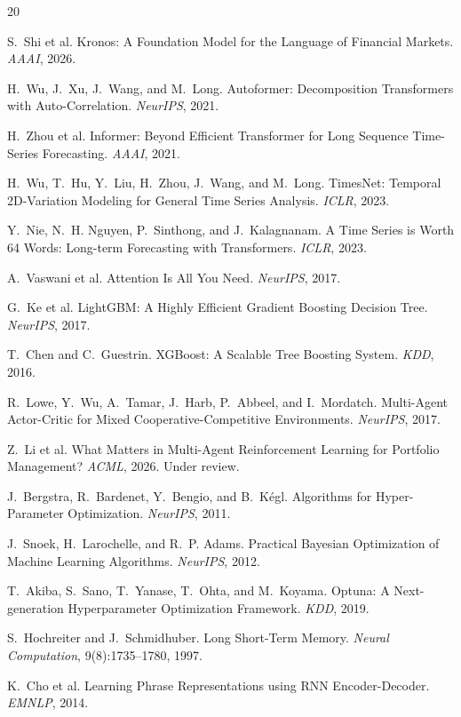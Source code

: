 \documentclass[sigconf,10pt]{acmart}
\begin{document}

\begin{thebibliography}{20}

S.~Shi et al.
\newblock Kronos: A Foundation Model for the Language of Financial Markets.
\newblock \emph{AAAI}, 2026.

H.~Wu, J.~Xu, J.~Wang, and M.~Long.
\newblock Autoformer: Decomposition Transformers with Auto-Correlation.
\newblock \emph{NeurIPS}, 2021.

H.~Zhou et al.
\newblock Informer: Beyond Efficient Transformer for Long Sequence Time-Series Forecasting.
\newblock \emph{AAAI}, 2021.

H.~Wu, T.~Hu, Y.~Liu, H.~Zhou, J.~Wang, and M.~Long.
\newblock TimesNet: Temporal 2D-Variation Modeling for General Time Series Analysis.
\newblock \emph{ICLR}, 2023.

Y.~Nie, N.~H. Nguyen, P.~Sinthong, and J.~Kalagnanam.
\newblock A Time Series is Worth 64 Words: Long-term Forecasting with Transformers.
\newblock \emph{ICLR}, 2023.

A.~Vaswani et al.
\newblock Attention Is All You Need.
\newblock \emph{NeurIPS}, 2017.

G.~Ke et al.
\newblock LightGBM: A Highly Efficient Gradient Boosting Decision Tree.
\newblock \emph{NeurIPS}, 2017.

T.~Chen and C.~Guestrin.
\newblock XGBoost: A Scalable Tree Boosting System.
\newblock \emph{KDD}, 2016.

R.~Lowe, Y.~Wu, A.~Tamar, J.~Harb, P.~Abbeel, and I.~Mordatch.
\newblock Multi-Agent Actor-Critic for Mixed Cooperative-Competitive Environments.
\newblock \emph{NeurIPS}, 2017.

Z.~Li et al.
\newblock What Matters in Multi-Agent Reinforcement Learning for Portfolio Management?
\newblock \emph{ACML}, 2026. Under review.

J.~Bergstra, R.~Bardenet, Y.~Bengio, and B.~K\'{e}gl.
\newblock Algorithms for Hyper-Parameter Optimization.
\newblock \emph{NeurIPS}, 2011.

J.~Snoek, H.~Larochelle, and R.~P. Adams.
\newblock Practical Bayesian Optimization of Machine Learning Algorithms.
\newblock \emph{NeurIPS}, 2012.

T.~Akiba, S.~Sano, T.~Yanase, T.~Ohta, and M.~Koyama.
\newblock Optuna: A Next-generation Hyperparameter Optimization Framework.
\newblock \emph{KDD}, 2019.

S.~Hochreiter and J.~Schmidhuber.
\newblock Long Short-Term Memory.
\newblock \emph{Neural Computation}, 9(8):1735--1780, 1997.

K.~Cho et al.
\newblock Learning Phrase Representations using RNN Encoder-Decoder.
\newblock \emph{EMNLP}, 2014.

\end{thebibliography}
\end{document}
